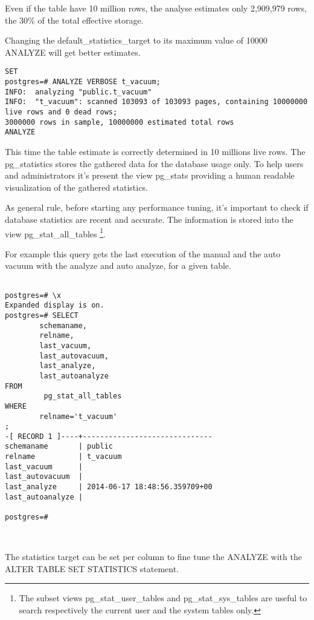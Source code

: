 Even if the table have 10 million rows, the analyse estimates only 2,909,979 rows, the 30\% of the 
total effective storage.

Changing the default\_statistics\_target to its maximum value of 10000 ANALYZE will get 
better estimates.


\begin{lstlisting}[style=pgsql]
SET
postgres=# ANALYZE VERBOSE t_vacuum;
INFO:  analyzing "public.t_vacuum"
INFO:  "t_vacuum": scanned 103093 of 103093 pages, containing 10000000 live rows and 0 dead rows; 
3000000 rows in sample, 10000000 estimated total rows
ANALYZE
\end{lstlisting}

This time the table estimate is correctly determined in 10 millions live rows.\newline
The pg\_statistics stores the gathered data for the database usage only. To help users and 
administrators it's present the view pg\_stats providing a human readable 
visualization of the gathered statistics.\newline

As general rule, before starting any performance tuning, it's important to check if 
database statistics are recent and accurate. The information is stored into the view 
pg\_stat\_all\_tables \footnote{The subset views pg\_stat\_user\_tables and pg\_stat\_sys\_tables 
are useful to search respectively the current user and the system tables only.}.

For example this query gets the last execution of the manual and the auto vacuum with the 
analyze and auto analyze, for a given table.

\begin{lstlisting}[style=pgsql]

postgres=# \x
Expanded display is on.
postgres=# SELECT
        schemaname,
        relname,
        last_vacuum,
        last_autovacuum,
        last_analyze,
        last_autoanalyze
FROM
         pg_stat_all_tables
WHERE
        relname='t_vacuum'
;
-[ RECORD 1 ]----+------------------------------
schemaname       | public
relname          | t_vacuum
last_vacuum      | 
last_autovacuum  | 
last_analyze     | 2014-06-17 18:48:56.359709+00
last_autoanalyze | 

postgres=# 



\end{lstlisting}


The statistics target can be set per column to fine tune the ANALYZE with the ALTER TABLE SET 
STATISTICS statement.

